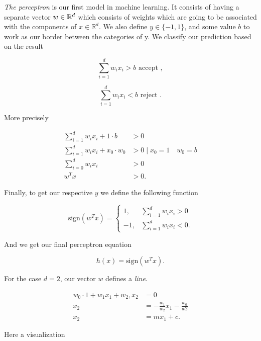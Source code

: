 \emph{The perceptron} is our first model in machine learning. It consists of having a separate vector \(w \in \mathbb{R}^d\) which consists of weights which are going to be
associated with the components of \(x \in \mathbb{R}^d\). We also define \(y \in \{-1,1\}\),  and some value \(b\) to work as our border between the categories of y.
We classify our prediction based on the result

\[
	\sum_{i = 1}^{d} w_i x_i > b \text{ accept },
\]

\[
	\sum_{i = 1}^{d} w_i x_i < b \text{ reject }.
\]

More precisely

\begin{align*}
	\sum_{i = 1}^{d} w_i x_i + 1 \cdot b     & > 0                             \\
	\sum_{i = 1}^{d} w_i x_i + x_0 \cdot w_0 & > 0  \mid x_0 = 1 \quad w_0 = b \\
	\sum_{i = 0}^{d} w_i x_i                 & > 0                             \\
	w^T x                                    & > 0.
\end{align*}

Finally, to get our respective \(y\) we define the following function

\[
	\text{sign}(w^T x) = \begin{cases}
		1,  & \sum_{i = 1}^{d} w_i x_i > 0 \\
		-1, & \sum_{i = 1}^{d} w_i x_i < 0.
	\end{cases}
\]

And we get our final perceptron equation

\[
	h(x) = \text{sign}(w^Tx).
\]

For the case \(d = 2\),  our vector \(w\) defines a \emph{line}.

\begin{align*}
	w_0 \cdot 1 + w_1 x_1 + w_2, x_2 & = 0                                      \\
	x_2                              & = - \frac{w_1}{w_2} x_1 - \frac{w_0}{w2} \\
	x_2                              & = m x_1 + c.
\end{align*}

Here a visualization


